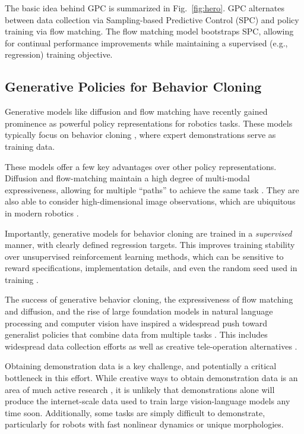 \documentclass[letterpaper, 10 pt]{ieeeconf}
\begin{document}
The basic idea behind GPC is summarized in Fig.~\ref{fig:hero}. GPC alternates between data collection via Sampling-based Predictive Control (SPC) and policy training via flow matching. The flow matching model bootstraps SPC, allowing for continual performance improvements while maintaining a supervised (e.g., regression) training objective.

\subsection{Generative Policies for Behavior Cloning}\label{sec:intro:behavior_cloning}

Generative models like diffusion \cite{chi2023diffusion} and flow matching \cite{black2024pi_0} have recently gained prominence as powerful policy representations for robotics tasks. These models typically focus on behavior cloning \cite{zhao2023learning, fu2024mobile}, where expert demonstrations serve as training data.

These models offer a few key advantages over other policy representations. Diffusion and flow-matching maintain a high degree of multi-modal expressiveness, allowing for multiple ``paths'' to achieve the same task \cite{chi2023diffusion}. They are also able to consider high-dimensional image observations, which are ubiquitous in modern robotics \cite{song2020score,song2019generative,lipman2022flow}.

Importantly, generative models for behavior cloning are trained in a \textit{supervised} manner, with clearly defined regression targets. This improves training stability over unsupervised reinforcement learning methods, which can be sensitive to reward specifications, implementation details, and even the random seed used in training \cite{andrychowicz2020matters, engstrom2019implementation}.

The success of generative behavior cloning, the expressiveness of flow matching and diffusion, and the rise of large foundation models in natural language processing and computer vision have inspired a widespread push toward generalist policies that combine data from multiple tasks \cite{black2024pi_0, lbm}. This includes widespread data collection efforts \cite{o2023open} as well as creative tele-operation alternatives \cite{chi2024universal}.

Obtaining demonstration data is a key challenge, and potentially a critical bottleneck in this effort. While creative ways to obtain demonstration data is an area of much active research \cite{chi2024universal}, it is unlikely that demonstrations alone will produce the internet-scale data used to train large vision-language models any time soon. Additionally, some tasks are simply difficult to demonstrate, particularly for robots with fast nonlinear dynamics or unique morphologies. 
\end{document}
